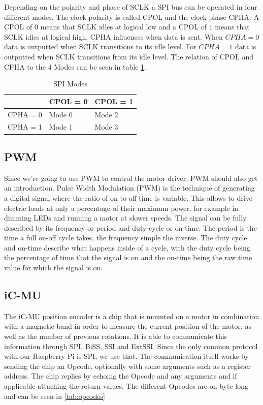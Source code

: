 Depending on the polarity and phase of SCLK a SPI bus can be operated in four different modes.
The clock polarity is called CPOL and the clock phase CPHA.
A CPOL of $0$ means that SCLK idles at logical low and a CPOL of $1$ means that SCLK idles at logical high.
CPHA influences when data is sent.
When $CPHA = 0$ data is outputted when SCLK transitions to its idle level.
For $CPHA = 1$ data is outputted when SCLK transitions from its idle level.
The relation of CPOL and CPHA to the 4 Modes can be seen in table \ref{tab:spi_modes}.

\begin{table}[hp]
    \begin{tabular}{|l|l|l|}
        \hline
                 & CPOL = 0 & CPOL = 1 \\ \hline
        CPHA = 0 & Mode 0   & Mode 2   \\ \hline
        CPHA = 1 & Mode 1   & Mode 3   \\ \hline
    \end{tabular}
    \caption{SPI Modes}
    \label{tab:spi_modes}
\end{table}

\subsection{PWM}
\label{sec:background:hardware:pwm}

Since we're going to use PWM to control the motor driver, PWM should also get an introduction.
Pulse Width Modulation (PWM) is the technique of generating a digital signal where the ratio of on to off time is variable.
This allows to drive electric loads at only a percentage of their maximum power,
for example in dimming LEDs and running a motor at slower speeds.
The signal can be fully described by its frequency or period and duty-cycle or on-time.
The period is the time a full on-off cycle takes, the frequency simple the inverse.
The duty cycle and on-time describe what happens inside of a cycle,
with the duty cycle being the percentage of time that the signal is on and the on-time being the raw time value for which the signal is on.

\subsection{iC-MU}
\label{sec:background:hardware:ic-mu}

The iC-MU position encoder is a chip that is mounted on a motor in combination with a magnetic band in order to measure the current position of the motor,
as well as the number of previous rotations.
It is able to communicate this information through SPI, BiSS, SSI and ExtSSI.
Since the only common protocol with our Raspberry Pi is SPI, we use that.
The communication itself works by sending the chip an Opcode, optionally with some arguments such as a register address.
The chip replies by echoing the Opcode and any arguments and if applicable attaching the return values.
The different Opcodes are on byte long and can be seen in \ref{tab:opcodes}

